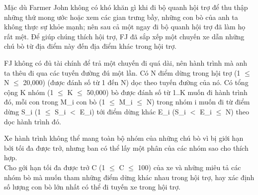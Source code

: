 Mặc dù Farmer John không có khó khăn gì khi đi bộ quanh hội trợ để thu thập những thứ mong ước hoặc xem các gian trưng bầy, những con bò của anh ta không thực sự khỏe mạnh; nên sau cả một ngay đi bộ quanh hội trợ đã làm họ rất mệt. Để giúp chúng thích hội trợ, FJ đã sắp xếp một chuyến xe dẫn những chú bò từ địa điểm này đến địa điểm khác trong hội trợ.  

   FJ không có đủ tài chính để trả một chuyến đi quá dài, nên hành trình mà  anh ta thêu đi qua các tuyến đường đú một lần. Có N điểm dừng trong hội  trợ (1  $\le$  N  $\le$  20,000) (được đánh số từ 1 đến N) dọc theo tuyến đường của  nó. Có tổng cộng K nhóm (1  $\le$  K  $\le$  50,000) bò được đánh số từ 1..K muốn đi hành trình đó, mỗi con trong M\_i con bò (1  $\le$  M\_i  $\le$  N) trong nhóm i  muốn đi từ điểm dừng S\_i (1  $\le$  S\_i $<$ E\_i) tới điểm dừng khác E\_i  (S\_i $<$ E\_i  $\le$  N) theo dọc hành trình đó.  

   Xe hành trình không thể mang toàn bộ nhóm của những chú bò vì bị giới hạn  bởi tối đa được trở, nhưng ban có thể lấy một phân của các nhóm sao cho thích hợp.   
\\

   Cho gới hạn tối đa được trở C (1  $\le$  C  $\le$  100) của xe và những miêu tả các  nhóm bò mà muốn tham những điểm dừng khác nhau trong hội trợ, hay xác định  số lượng con bò lớn nhất có thể đi tuyến xe trong hội trợ.  

\